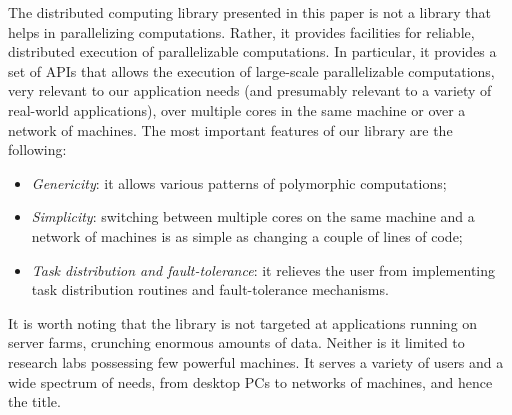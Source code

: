 \documentclass[preprint]{sigplanconf}
\begin{document}
The distributed computing library presented in this paper is not a
library that helps in parallelizing computations. Rather, it provides
facilities for reliable, distributed execution of parallelizable
computations. In particular, it provides a set of APIs that allows the
execution of large-scale parallelizable computations, very relevant to
our application needs (and presumably relevant to a variety of
real-world applications), over multiple cores in the same machine or
over a network of machines. 
The most important features of our library are the following:
\begin{itemize}
\item \emph{Genericity}: 
  it allows various patterns of polymorphic computations;
\item \emph{Simplicity}: switching between multiple cores on the same
  machine and a network of machines is as simple as changing a couple
  of lines of code;
\item \emph{Task distribution and fault-tolerance}: 
  it relieves the user from implementing task distribution routines
  and fault-tolerance mechanisms.
\end{itemize}
It is worth noting that the library is not targeted at applications
running on server farms, crunching enormous amounts of data. Neither
is it limited to research labs possessing few powerful
machines. It serves a variety of users and a wide
spectrum of needs, from desktop PCs to networks of machines, and hence
the title.




\end{document}

